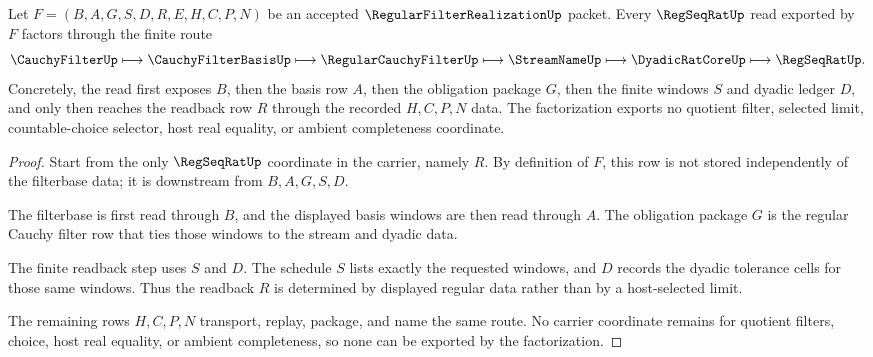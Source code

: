 \begin{theorem}
\label{thm:regular-filter-realization-regseqrat-factorization}
Let $F=(B,A,G,S,D,R,E,H,C,P,N)$ be an accepted $\RegularFilterRealizationUp$ packet. Every $\RegSeqRatUp$ read exported by $F$ factors through the finite route
$$
\CauchyFilterUp \longmapsto \CauchyFilterBasisUp \longmapsto \RegularCauchyFilterUp \longmapsto \StreamNameUp \longmapsto \DyadicRatCoreUp \longmapsto \RegSeqRatUp .
$$
Concretely, the read first exposes $B$, then the basis row $A$, then the obligation package $G$, then the finite windows $S$ and dyadic ledger $D$, and only then reaches the readback row $R$ through the recorded $H,C,P,N$ data. The factorization exports no quotient filter, selected limit, countable-choice selector, host real equality, or ambient completeness coordinate.
\end{theorem}
\begin{proof}
Start from the only $\RegSeqRatUp$ coordinate in the carrier, namely $R$. By definition of $F$, this row is not stored independently of the filterbase data; it is downstream from $B,A,G,S,D$.

The filterbase is first read through $B$, and the displayed basis windows are then read through $A$. The obligation package $G$ is the regular Cauchy filter row that ties those windows to the stream and dyadic data.

The finite readback step uses $S$ and $D$. The schedule $S$ lists exactly the requested windows, and $D$ records the dyadic tolerance cells for those same windows. Thus the readback $R$ is determined by displayed regular data rather than by a host-selected limit.

The remaining rows $H,C,P,N$ transport, replay, package, and name the same route. No carrier coordinate remains for quotient filters, choice, host real equality, or ambient completeness, so none can be exported by the factorization.
\end{proof}

